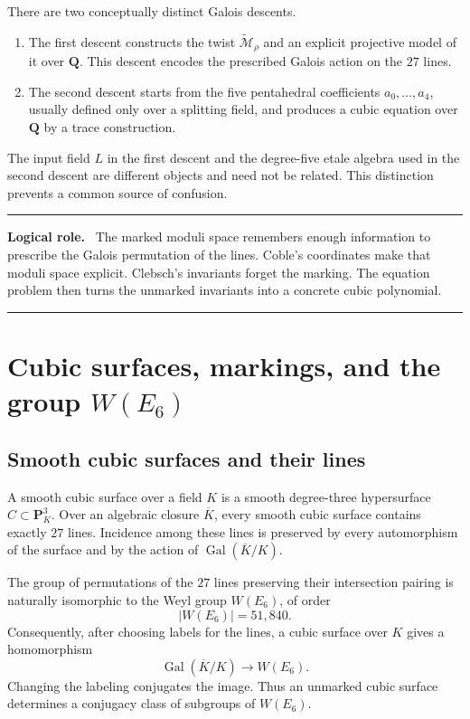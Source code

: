 \documentclass[11pt]{article}
\newcommand{\QQ}{\mathbf{Q}}
\newcommand{\PP}{\mathbf{P}}
\newcommand{\ol}[1]{\overline{#1}}
\newcommand{\Gal}{\operatorname{Gal}}
\newcommand{\tcM}{\widetilde{\mathcal{M}}}
\newenvironment{roadmap}{%
  \begin{center}\begin{minipage}{0.93\textwidth}\small
  \hrule\vspace{0.55em}\textbf{Logical role.}\ }{%
  \vspace{0.55em}\hrule\end{minipage}\end{center}}
\begin{document}
There are two conceptually distinct Galois descents.

\begin{enumerate}[label=\textbf{Descent \arabic*.}]
\item The first descent constructs the twist $\tcM_{\rho}$ and an explicit
projective model of it over $\QQ$.  This descent encodes the prescribed
Galois action on the $27$ lines.
\item The second descent starts from the five pentahedral coefficients
$a_0,\ldots,a_4$, usually defined only over a splitting field, and produces a
cubic equation over $\QQ$ by a trace construction.
\end{enumerate}

The input field $L$ in the first descent and the degree-five etale algebra
used in the second descent are different objects and need not be related.
This distinction prevents a common source of confusion.

\begin{roadmap}
The marked moduli space remembers enough information to prescribe the Galois
permutation of the lines.  Coble's coordinates make that moduli space
explicit.  Clebsch's invariants forget the marking.  The equation problem
then turns the unmarked invariants into a concrete cubic polynomial.
\end{roadmap}

\section{Cubic surfaces, markings, and the group $W(E_6)$}

\subsection{Smooth cubic surfaces and their lines}

A smooth cubic surface over a field $K$ is a smooth degree-three hypersurface
$C\subset \PP^3_K$.  Over an algebraic closure $\ol K$, every smooth cubic
surface contains exactly $27$ lines.  Incidence among these lines is
preserved by every automorphism of the surface and by the action of
$\Gal(\ol K/K)$.

The group of permutations of the $27$ lines preserving their intersection
pairing is naturally isomorphic to the Weyl group $W(E_6)$, of order
\[
  |W(E_6)|=51{,}840.
\]
Consequently, after choosing labels for the lines, a cubic surface over $K$
gives a homomorphism
\[
  \Gal(\ol K/K)\longrightarrow W(E_6).
\]
Changing the labeling conjugates the image.  Thus an unmarked cubic surface
determines a conjugacy class of subgroups of $W(E_6)$.
\end{document}
